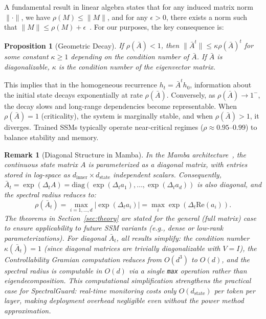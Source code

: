 \documentclass[10pt,twocolumn]{article}
\newtheorem{proposition}{Proposition}
\newtheorem{remark}{Remark}
\begin{document}
A fundamental result in linear algebra states that for any induced matrix norm $\|\cdot\|$, we have $\rho(M) \le \|M\|$, and for any $\epsilon>0$, there exists a norm such that $\|M\| \le \rho(M) + \epsilon$~\cite{horn2012matrix}. For our purposes, the key consequence is:

\begin{proposition}[Geometric Decay]
If $\rho(\bar{A})<1$, then $\|\bar{A}^t\| \le \kappa \rho(\bar{A})^t$ for some constant $\kappa\ge 1$ depending on the condition number of $\bar{A}$. If $\bar{A}$ is diagonalizable, $\kappa$ is the condition number of the eigenvector matrix.
\end{proposition}

This implies that in the homogeneous recurrence $h_t = \bar{A}^t h_0$, information about the initial state decays exponentially at rate $\rho(\bar{A})$. Conversely, as $\rho(\bar{A})\to 1^{-}$, the decay slows and long-range dependencies become representable. When $\rho(\bar{A})=1$ (criticality), the system is marginally stable, and when $\rho(\bar{A})>1$, it diverges. Trained SSMs typically operate near-critical regimes ($\rho\approx 0.95$--$0.99$) to balance stability and memory.

\begin{remark}[Diagonal Structure in Mamba]
\label{rem:diagonal}
In the Mamba architecture~\cite{gu2023mamba}, the continuous state matrix $A$ is parameterized as a \emph{diagonal} matrix, with entries stored in log-space as $d_{\text{inner}} \times d_{\text{state}}$ independent scalars. Consequently, $\bar{A}_t = \exp(\Delta_t A) = \text{diag}(\exp(\Delta_t a_1), \dots, \exp(\Delta_t a_d))$ is also diagonal, and the spectral radius reduces to:
\begin{equation}
    \rho(\bar{A}_t) = \max_{i=1,\dots,d} |\exp(\Delta_t a_i)| = \max_i \exp(\Delta_t \text{Re}(a_i)).
    \label{eq:diagonal_rho}
\end{equation}
The theorems in Section~\ref{sec:theory} are stated for the general (full matrix) case to ensure applicability to future SSM variants (e.g., dense or low-rank parameterizations). For diagonal $\bar{A}_t$, all results simplify: the condition number $\kappa(\bar{A}_t) = 1$ (since diagonal matrices are trivially diagonalizable with $V = I$), the Controllability Gramian computation reduces from $O(d^3)$ to $O(d)$, and the spectral radius is computable in $O(d)$ via a single \texttt{max} operation rather than eigendecomposition. This computational simplification \emph{strengthens} the practical case for SpectralGuard: real-time monitoring costs only $O(d_{\text{state}})$ per token per layer, making deployment overhead negligible even without the power method approximation.
\end{remark}
\end{document}
